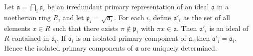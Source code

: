 Let $\mathfrak{a} = \bigcap_i \mathfrak{a}_i$ be an irredundant primary representation of an ideal $\mathfrak{a}$ in a noetherian ring $R$, and let $\mathfrak{p}_i = \sqrt{\mathfrak{a}_i}$. For each $i$, define $\mathfrak{a}'_i$ as the set of all elements $x \in R$ such that there exists $\pi \notin \mathfrak{p}_i$ with $\pi x \in \mathfrak{a}$. Then $\mathfrak{a}'_i$ is an ideal of $R$ contained in $\mathfrak{a}_i$. If $\mathfrak{a}_i$ is an isolated primary component of $\mathfrak{a}$, then $\mathfrak{a}'_i = \mathfrak{a}_i$. Hence the isolated primary components of $\mathfrak{a}$ are uniquely determined.
